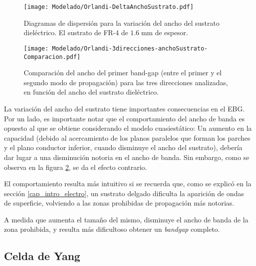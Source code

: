 \begin{figure}[h]
	\centering
	\texttt{[image: Modelado/Orlandi-DeltaAnchoSustrato.pdf]}
	\caption{Diagramas de dispersión para la variación del ancho del sustrato dieléctrico. El sustrato de FR-4 de $1.6\;\text{mm}$ de espesor.}
	\label{fig:diagdisp-orlandi-variacion-ancho-diel}
\end{figure}


\begin{figure}[h]
	\centering
	\texttt{[image: Modelado/Orlandi-3direcciones-anchoSustrato-Comparacion.pdf]}
	\caption{Comparación del ancho del primer band-gap (entre el primer y el segundo modo de propagación) para las tres direcciones analizadas, en función del ancho del sustrato dieléctrico.}
	\label{fig:comparacion-diagdisp-orlandi-variacion-ancho-diel}
\end{figure}

La variación del ancho del sustrato tiene importantes consecuencias en el EBG. Por un lado, es importante notar que el comportamiento del ancho de banda es opuesto al que se obtiene considerando el modelo cuasiestático: Un aumento en la capacidad (debido al acercamiento de los planos paralelos que forman los parches y el plano conductor inferior, cuando disminuye el ancho del sustrato), debería dar lugar a una disminución notoria en el ancho de banda. Sin embargo, como se observa en la figura \ref{fig:comparacion-diagdisp-orlandi-variacion-ancho-diel}, se da el efecto contrario.

El comportamiento resulta más intuitivo si se recuerda que, como se explicó en la sección \ref{cap_intro_electro}, un sustrato delgado dificulta la aparición de ondas de superficie, volviendo a las zonas prohibidas de propagación más notorias.

A medida que aumenta el tamaño del mismo, disminuye el ancho de banda de la zona prohibida, y resulta más dificultoso obtener un \textit{bandgap} completo.

\clearpage

\subsection{Celda de Yang}

